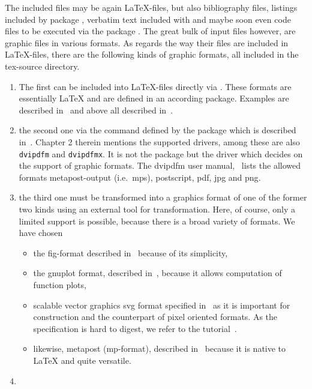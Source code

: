 The included files may be again \LaTeX-files, but also bibliography files, 
listings included by package , verbatim text included with  
and maybe soon even code files to be executed via the package . 
The great bulk of input files however, are graphic files in various formats. 
As regards the way their files are included in \LaTeX-files, 
there are the following kinds of graphic formats, 
all included in the tex-source directory. 
%
\begin{enumerate}
\item
The first can be included into \LaTeX-files directly via . 
These formats are essentially \LaTeX{}
and are defined in an according package. 
Examples are  described in~\cite{EEpic}
and above all  described in~\cite{TikzPGF}. 
\item
the second one via the command  
defined by the package  
which is described in~\cite{GraX}. 
Chapter 2 therein mentions the supported drivers, 
among these are also \texttt{dvipdfm} and \texttt{dvipdfmx}. 
It is not the package but the driver 
which decides on the support of graphic formats. 
The dvipdfm user manual,~\cite{DviPdfMx} lists the allowed formats 
metapost-output (i.e.~\gls{mps}), postscript, 
\gls{pdf}, \gls{jpg} and \gls{png}. 
\item\label{it:transExp}
the third one must be transformed into a graphics format 
of one of the former two kinds using an external tool for transformation. 
Here, of course, only a limited support is possible, 
because there is a broad variety of formats. 
We have chosen
%
\begin{itemize}
\item
the \gls{fig}-format described in~\cite{XFigF}
because of its simplicity, 
\item
the gnuplot format, described in~\cite{GnuPlot}, 
because it allows computation of function plots, 
\item
  scalable vector graphics svg format specified in~\cite{Svg11} 
  as it is important for construction and the counterpart of pixel oriented
  formats.
  As the specification is hard to digest,
  we refer to the tutorial~\cite{SvgTut}. 
\item
  likewise, metapost (\gls{mp}-format),
  described in~\cite{MPost} because it is native to \LaTeX{} 
  and quite versatile. 
\end{itemize}
\item\label{it:transImp}

\end{enumerate}
